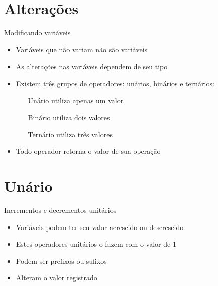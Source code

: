 \documentclass[11pt]{beamer}
\subtitle{Qual o resultado?}
\begin{document}
\begin{frame}
	\titlepage
\end{frame}

\begin{frame}
	\tableofcontents
\end{frame}

\section{Alterações}
	\begin{frame}{Modificando variáveis}
		\begin{itemize}
			\presentationPause\item Variáveis que não variam não são variáveis
			\presentationPause\item As alterações nas variáveis dependem de seu tipo
			\presentationPause\item Existem três grupos de operadores: unários, binários e ternários:
			\begin{itemize}
				\presentationPause\item[Unário] utiliza apenas um valor
				\presentationPause\item[Binário] utiliza dois valores
				\presentationPause\item[Ternário] utiliza três valores
			\end{itemize}
			\presentationPause\item Todo operador retorna o valor de sua operação
		\end{itemize}
	\end{frame}

\section{Unário}
	\begin{frame}{Incrementos e decrementos unitários}
		\only<1>
		{	
			\begin{itemize}
				\presentationPause\item Variáveis podem ter seu valor acrescido ou descrescido
				\presentationPause\item Estes operadores unitários o fazem com o valor de 1
				\presentationPause\item Podem ser prefixos ou sufixos
				\presentationPause\item Alteram o valor registrado
			\end{itemize}
			\presentationPause
		}
		{
			\presentationPause
		}
	\end{frame}
\end{document}
